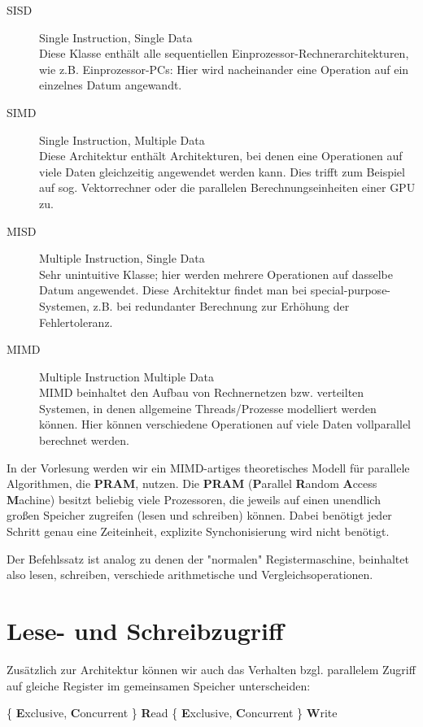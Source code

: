 \begin{description}
\item[SISD] Single Instruction, Single  Data \\
Diese Klasse enthält alle sequentiellen Einprozessor-Rechnerarchitekturen, wie z.B. Einprozessor-PCs: Hier wird nacheinander eine Operation auf ein einzelnes Datum angewandt.
\item[SIMD] Single Instruction, Multiple Data \\
Diese Architektur enthält Architekturen, bei denen eine Operationen auf viele Daten gleichzeitig angewendet werden kann. Dies trifft zum Beispiel auf sog. Vektorrechner oder die parallelen Berechnungseinheiten einer GPU zu.
\item[MISD] Multiple Instruction, Single Data \\
Sehr unintuitive Klasse; hier werden mehrere Operationen auf dasselbe Datum angewendet. Diese Architektur findet man bei special-purpose-Systemen, z.B. bei redundanter Berechnung zur Erhöhung der Fehlertoleranz.
\item[MIMD] Multiple Instruction Multiple Data \\
MIMD beinhaltet den Aufbau von Rechnernetzen bzw. verteilten Systemen, in denen allgemeine Threads/Prozesse modelliert werden können. Hier können verschiedene Operationen auf viele Daten vollparallel berechnet werden.
\end{description}

In der Vorlesung werden wir ein MIMD-artiges theoretisches Modell für parallele Algorithmen, die \textbf{PRAM}, nutzen. Die \textbf{PRAM} (\textbf{P}arallel \textbf{R}andom \textbf{A}ccess \textbf{M}achine) besitzt beliebig viele Prozessoren, die jeweils auf einen unendlich großen Speicher zugreifen (lesen und schreiben) können. Dabei benötigt jeder Schritt genau eine Zeiteinheit, explizite Synchonisierung wird nicht benötigt.

Der Befehlssatz ist analog zu denen der "normalen" Registermaschine, beinhaltet also lesen, schreiben, verschiede arithmetische und Vergleichsoperationen.

\section{Lese- und Schreibzugriff}
Zusätzlich zur Architektur können wir auch das Verhalten bzgl. parallelem Zugriff auf gleiche Register im gemeinsamen Speicher unterscheiden:

\begin{center}
\{ \textbf{E}xclusive, \textbf{C}oncurrent \} \textbf{R}ead \{ \textbf{E}xclusive, \textbf{C}oncurrent \} \textbf{W}rite
\end{center}

